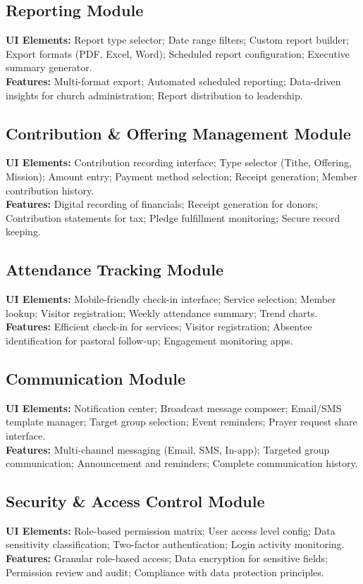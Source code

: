 \documentclass[12pt]{report}
\begin{document}
\subsection{Reporting Module}
\textbf{UI Elements:} Report type selector; Date range filters; Custom report builder; Export formats (PDF, Excel, Word); Scheduled report configuration; Executive summary generator. \\
\textbf{Features:} Multi-format export; Automated scheduled reporting; Data-driven insights for church administration; Report distribution to leadership.

\subsection{Contribution \& Offering Management Module}
\textbf{UI Elements:} Contribution recording interface; Type selector (Tithe, Offering, Mission); Amount entry; Payment method selection; Receipt generation; Member contribution history. \\
\textbf{Features:} Digital recording of financials; Receipt generation for donors; Contribution statements for tax; Pledge fulfillment monitoring; Secure record keeping.

\subsection{Attendance Tracking Module}
\textbf{UI Elements:} Mobile-friendly check-in interface; Service selection; Member lookup; Visitor registration; Weekly attendance summary; Trend charts. \\
\textbf{Features:} Efficient check-in for services; Visitor registration; Absentee identification for pastoral follow-up; Engagement monitoring apps.

\subsection{Communication Module}
\textbf{UI Elements:} Notification center; Broadcast message composer; Email/SMS template manager; Target group selection; Event reminders; Prayer request share interface. \\
\textbf{Features:} Multi-channel messaging (Email, SMS, In-app); Targeted group communication; Announcement and reminders; Complete communication history.

\subsection{Security \& Access Control Module}
\textbf{UI Elements:} Role-based permission matrix; User access level config; Data sensitivity classification; Two-factor authentication; Login activity monitoring. \\
\textbf{Features:} Granular role-based access; Data encryption for sensitive fields; Permission review and audit; Compliance with data protection principles.
\end{document}
